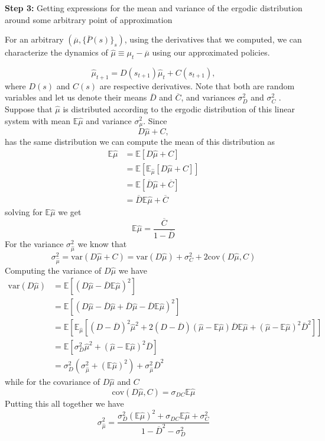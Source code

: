 \documentclass[thmsb,11pt]{article}
\newcommand{\EE}{\mathbb E}
\newcommand{\var}{\mathrm{var}}
\newcommand{\cov}{\mathrm{cov}}
\newcommand{\barC}{{\overline C}}
\newcommand{\barD}{{\overline D}}
\newcommand{\mubar}{{\overline \mu}}
\begin{document}
\textbf{Step 3:} Getting expressions for the mean and variance of the ergodic distribution around some arbitrary point of approximation

For an arbitrary $\left (\overline \mu,\{\overline {P}(s )\}_{s}\right)$, using the derivatives that we computed, we can characterize the dynamics of $\hat{\mu}\equiv\mu_t-\mubar$ using our approximated policies.


\begin{equation}
\label{eq linear dynamics of mu}
\hat \mu_{t+1} = D(s_{t+1}) \hat\mu_t + C(s_{t+1}),
\end{equation}
where $D(s)$ and $C(s)$ are respective derivatives. Note that both are random variables and let us denote their means $\barD$ and $\barC$, and variances $\sigma_D^2$ and $\sigma_C^2$ .  Suppose that $\hat\mu$ is distributed according to the ergodic distribution of this linear system with mean $\EE\hat\mu$ and variance $\sigma^2_\mu$.  Since
\[
	D\hat\mu +C,
\]has the same distribution we can compute the mean of this distribution as
\[
\begin{split}
	\EE\hat\mu &= \EE\left[ D\hat\mu+C\right]\\
			  &= \EE\left[\EE_{\hat\mu}\left[D\hat\mu+C\right]\right]\\
			  &= \EE\left[\barD\hat\mu +\barC\right]\\
			  &=\barD\EE\hat\mu+\barC
\end{split}
\]solving for $\EE\hat\mu$ we get
\begin{equation}
	\EE\hat\mu = \frac{\barC}{1-\barD}
\end{equation}For the variance $\sigma^2_{\hat\mu}$ we know that
\[
	\sigma^2_{\hat\mu} = \var(D\hat\mu+C) = \var(D\hat\mu) + \sigma_C^2 + 2\cov(D\hat\mu,C)
\]Computing the variance of $D\hat \mu$ we have
\[
\begin{split}
	\var(D\hat\mu) &=\EE\left[(D\hat\mu - \barD\EE\hat\mu)^2\right]\\
			       &=\EE\left[(D\hat\mu-\barD\hat\mu +\barD\hat\mu -\barD\EE\hat\mu)^2\right]\\
			      &=\EE\left[\EE_{\hat\mu}\left[(D-\barD)^2\hat\mu^2 +2(D-\barD)(\hat\mu-\EE\hat\mu)\barD\EE\hat\mu + (\hat\mu-\EE\hat\mu)^2\bar D^2\right]\right]\\
			&=\EE\left[\sigma_D^2\hat\mu^2 +(\hat\mu-\EE\hat\mu)^2\barD\right]\\
			& = \sigma_D^2(\sigma_{\hat\mu}^2+(\EE\hat\mu)^2) + \sigma_{\hat\mu}^2\barD^2
\end{split}
\]while for the covariance of $D\hat\mu$ and $C$
\[
	\cov(D\hat\mu,C) = \sigma_{DC}\EE\hat\mu
\]Putting this all together we have
\begin{equation}
	\sigma_{\hat\mu}^2 = \frac{\sigma_D^2(\EE\hat\mu)^2 + \sigma_{DC}\EE\hat\mu + \sigma_C^2}{1-\barD^2-\sigma_D^2}
\end{equation}
\end{document}
